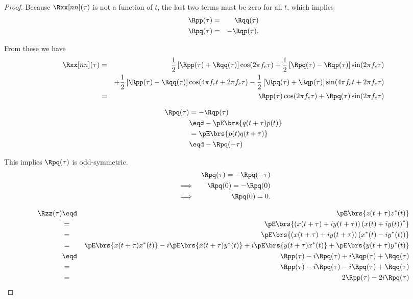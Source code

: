 \begin{proof}
Because $\Rxx[nn](\tau)$ is not a function of $t$,
the last two terms must be zero for all $t$,
which implies
\begin{eqnarray*}
   \Rpp(\tau) &=& \Rqq(\tau)   \\
   \Rpq(\tau) &=& -\Rqp(\tau).
\end{eqnarray*}

From these we have
\begin{eqnarray*}
\Rxx[nn](\tau)
     &=& \frac{1}{2}\left[ \Rpp(\tau) + \Rqq(\tau)\right] \cos(2\pi f_c\tau)
        +\frac{1}{2}\left[ \Rpq(\tau) - \Rqp(\tau)\right] \sin(2\pi f_c\tau)
   \\&& +\frac{1}{2}\left[ \Rpp(\tau) - \Rqq(\tau)\right] \cos(4\pi f_ct + 2\pi f_c\tau)
        -\frac{1}{2}\left[ \Rpq(\tau) + \Rqp(\tau)\right] \sin(4\pi f_ct + 2\pi f_c\tau)
%
   \\&=& \Rpp(\tau)\cos(2\pi f_c\tau) +\Rpq(\tau)\sin(2\pi f_c\tau)
\end{eqnarray*}

\begin{align*}
   \Rpq(\tau)
     &=      -\Rqp(\tau)
   \\&\eqd -\pE\brs{q(t+\tau) p(t)}
   \\&=       \pE\brs{p(t) q(t+\tau)}
   \\&\eqd -\Rpq(-\tau)
\end{align*}

This implies
$\Rpq(\tau)$ is odd-symmetric. \\
\begin{eqnarray*}
     &&          \Rpq(\tau)= -\Rpq(-\tau)
   \\&\implies&  \Rpq(0)= -\Rpq(0)
   \\&\implies&  \Rpq(0)=0.
\end{eqnarray*}


\begin{eqnarray*}
   \Rzz(\tau)
     &\eqd& \pE\brs{z(t+\tau)z^\ast(t)}
   \\&=&      \pE\brs{\left( x(t+\tau) + iy(t+\tau)\right)\left( x(t) + iy(t)\right)^\ast}
   \\&=&      \pE\brs{\left( x(t+\tau) + iy(t+\tau)\right)\left( x^\ast(t) - iy^\ast(t)\right)}
%
   \\&=&      \pE\brs{ x(t+\tau)x^\ast(t) }
       -     i\pE\brs{ x(t+\tau)y^\ast(t) }
       +     i\pE\brs{ y(t+\tau)x^\ast(t) }
       +      \pE\brs{ y(t+\tau)y^\ast(t) }
%
   \\&\eqd& \Rpp(\tau) - i\Rpq(\tau) + i\Rqp(\tau) + \Rqq(\tau)
   \\&=&      \Rpp(\tau) - i\Rpq(\tau) - i\Rpq(\tau) + \Rqq(\tau)
   \\&=&      2\Rpp(\tau) - 2i\Rpq(\tau)
\end{eqnarray*}
\end{proof}




